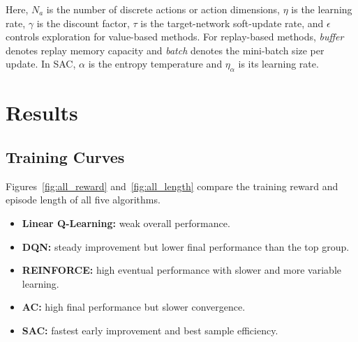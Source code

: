 \documentclass[11pt]{article} %
\begin{document}
\noindent
Here, $N_a$ is the number of discrete actions or action dimensions, $\eta$ is the learning rate, $\gamma$ is the discount factor, $\tau$ is the target-network soft-update rate, and $\epsilon$ controls exploration for value-based methods. For replay-based methods, \textit{buffer} denotes replay memory capacity and \textit{batch} denotes the mini-batch size per update. In SAC, $\alpha$ is the entropy temperature and $\eta_\alpha$ is its learning rate.

\section{Results}

\subsection{Training Curves}
Figures~\ref{fig:all_reward} and~\ref{fig:all_length} compare the training reward and episode length of all five algorithms.
\begin{itemize}
    \item \textbf{Linear Q-Learning:} weak overall performance.
    \item \textbf{DQN:} steady improvement but lower final performance than the top group.
    \item \textbf{REINFORCE:} high eventual performance with slower and more variable learning.
    \item \textbf{AC:} high final performance but slower convergence.
    \item \textbf{SAC:} fastest early improvement and best sample efficiency.
\end{itemize}
\end{document}
